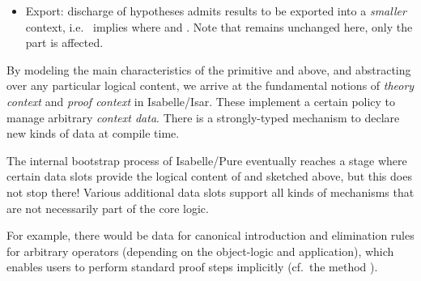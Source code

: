 \begin{isabellebody}
\begin{isamarkuptext}
\begin{itemize}
  \item Export: discharge of hypotheses admits results to be exported
  into a \emph{smaller} context, i.e.\ 
  implies  where  and
  .  Note that  remains unchanged here,
  only the  part is affected.

  \end{itemize}

  \medskip By modeling the main characteristics of the primitive
   and  above, and abstracting over any
  particular logical content, we arrive at the fundamental notions of
  \emph{theory context} and \emph{proof context} in Isabelle/Isar.
  These implement a certain policy to manage arbitrary \emph{context
  data}.  There is a strongly-typed mechanism to declare new kinds of
  data at compile time.

  The internal bootstrap process of Isabelle/Pure eventually reaches a
  stage where certain data slots provide the logical content of  and  sketched above, but this does not stop there!
  Various additional data slots support all kinds of mechanisms that
  are not necessarily part of the core logic.

  For example, there would be data for canonical introduction and
  elimination rules for arbitrary operators (depending on the
  object-logic and application), which enables users to perform
  standard proof steps implicitly (cf.\ the  method
  \cite{isabelle-isar-ref}).


\end{isamarkuptext}
\end{isabellebody}

